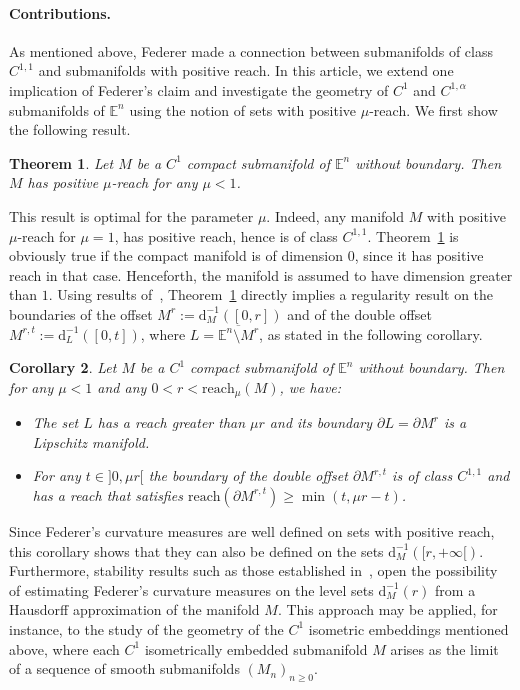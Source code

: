 \documentclass[11pt,reqno,a4paper]{article}%
\newtheorem{theorem}{Theorem}[section]
\newtheorem{corollary}[theorem]{Corollary}
\theoremstyle{definition}
\theoremstyle{remark}
\renewcommand{\geq}{\geqslant}
\renewcommand{\d}{\mathrm{d}}
\newcommand{\E}{\mathbb{E}}
\newcommand{\reach}{\mathrm{reach}} %
\renewcommand{\d}{\mathrm{d}}
\begin{document}
\paragraph{Contributions.} As mentioned above, Federer made a connection between submanifolds of class $C^{1,1}$ and submanifolds with positive reach. In this article, we extend one implication of Federer's claim and investigate the geometry of $C^1$ and $C^{1,\alpha}$ submanifolds of $\E^n$ using the notion of sets with positive $\mu$-reach. We first show the following result. 
\begin{theorem} \label{theo: C1_implique_continuite_fonction_crit}
Let $M$ be a $C^1$ compact submanifold of $\E^n$ without boundary. Then $M$ has positive $\mu$-reach for any $\mu < 1$. \end{theorem} 
This result is optimal for the parameter $\mu$. Indeed, any manifold $M$ with  positive $\mu$-reach for $\mu=1$, has positive reach, hence is of class $C^{1,1}$. Theorem~\ref{theo: C1_implique_continuite_fonction_crit} is obviously true if the compact manifold is of dimension $0$, since it has positive reach in that case. Henceforth, the manifold is assumed to have dimension greater than $1$. Using results of~\cite{fu1985tubular,chazal2007shape}, Theorem~\ref{theo: C1_implique_continuite_fonction_crit} directly implies a regularity result on the boundaries of the offset $M^r:=\d_M^{-1}([0,r])$ and of the double offset $M^{r,t}:=\d_L^{-1}([0,t])$, where $L=\overline{\E^n\setminus M^r}$, as stated in the following corollary.
\begin{corollary}\label{coro:offsetshavepositivereach}
Let $M$ be a $C^1$ compact submanifold of $\E^n$ without boundary.  Then for any $\mu<1$ and any $0<r<\reach_\mu(M)$, we have: 
\begin{itemize}
\item The set $L$ has a reach greater than $\mu r$ and its boundary $\partial L=\partial M^r$ is a Lipschitz manifold.
\item For any $t\in]0,\mu r[$ the boundary of the double offset $\partial M^{r,t}$ is of class $C^{1,1}$ and has a reach that satisfies  $\reach(\partial M^{r,t}) \geq \min(t,\mu r - t)$.
\end{itemize}
\end{corollary}

Since Federer's curvature measures are well defined on sets with positive reach, this corollary shows that they can also be defined on the sets $\d_M^{-1}([r,+\infty[)$. Furthermore, stability results such as those established in~\cite{chazal2009stability}, open the possibility of estimating Federer's curvature measures on the level sets $\d_M^{-1}(r)$ from a Hausdorff approximation of the manifold $M$. This approach may be applied, for instance, to the study of the geometry of the $C^1$ isometric embeddings mentioned above, where each $C^1$
isometrically embedded submanifold $M$ arises as the limit of a sequence of smooth submanifolds $(M_n)_{n\geq 0}$.\\
\end{document}

